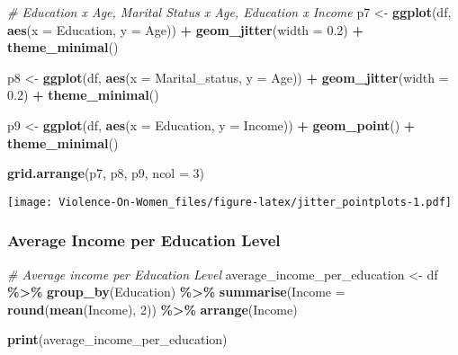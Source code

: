 \documentclass[
]{article}
\newenvironment{Shaded}{\begin{snugshade}}{\end{snugshade}}
\newcommand{\AttributeTok}[1]{\textcolor[rgb]{0.13,0.29,0.53}{#1}}
\newcommand{\CommentTok}[1]{\textcolor[rgb]{0.56,0.35,0.01}{\textit{#1}}}
\newcommand{\DecValTok}[1]{\textcolor[rgb]{0.00,0.00,0.81}{#1}}
\newcommand{\FloatTok}[1]{\textcolor[rgb]{0.00,0.00,0.81}{#1}}
\newcommand{\FunctionTok}[1]{\textcolor[rgb]{0.13,0.29,0.53}{\textbf{#1}}}
\newcommand{\NormalTok}[1]{#1}
\newcommand{\OtherTok}[1]{\textcolor[rgb]{0.56,0.35,0.01}{#1}}
\newcommand{\SpecialCharTok}[1]{\textcolor[rgb]{0.81,0.36,0.00}{\textbf{#1}}}
\begin{document}
\begin{Shaded}
\begin{Highlighting}[]
\CommentTok{\# Education x Age, Marital Status x Age, Education x Income}
\NormalTok{p7 }\OtherTok{\textless{}{-}} \FunctionTok{ggplot}\NormalTok{(df, }\FunctionTok{aes}\NormalTok{(}\AttributeTok{x =}\NormalTok{ Education, }\AttributeTok{y =}\NormalTok{ Age)) }\SpecialCharTok{+}
  \FunctionTok{geom\_jitter}\NormalTok{(}\AttributeTok{width =} \FloatTok{0.2}\NormalTok{) }\SpecialCharTok{+}
  \FunctionTok{theme\_minimal}\NormalTok{()}

\NormalTok{p8 }\OtherTok{\textless{}{-}} \FunctionTok{ggplot}\NormalTok{(df, }\FunctionTok{aes}\NormalTok{(}\AttributeTok{x =}\NormalTok{ Marital\_status, }\AttributeTok{y =}\NormalTok{ Age)) }\SpecialCharTok{+}
  \FunctionTok{geom\_jitter}\NormalTok{(}\AttributeTok{width =} \FloatTok{0.2}\NormalTok{) }\SpecialCharTok{+}
  \FunctionTok{theme\_minimal}\NormalTok{()}

\NormalTok{p9 }\OtherTok{\textless{}{-}} \FunctionTok{ggplot}\NormalTok{(df, }\FunctionTok{aes}\NormalTok{(}\AttributeTok{x =}\NormalTok{ Education, }\AttributeTok{y =}\NormalTok{ Income)) }\SpecialCharTok{+}
  \FunctionTok{geom\_point}\NormalTok{() }\SpecialCharTok{+}
  \FunctionTok{theme\_minimal}\NormalTok{()}

\FunctionTok{grid.arrange}\NormalTok{(p7, p8, p9, }\AttributeTok{ncol =} \DecValTok{3}\NormalTok{)}
\end{Highlighting}
\end{Shaded}

\texttt{[image: Violence-On-Women\_files/figure-latex/jitter\_pointplots-1.pdf]}

\hypertarget{average-income-per-education-level}{%
\subsubsection{Average Income per Education
Level}\label{average-income-per-education-level}}

\begin{Shaded}
\begin{Highlighting}[]
\CommentTok{\# Average income per Education Level}
\NormalTok{average\_income\_per\_education }\OtherTok{\textless{}{-}}\NormalTok{ df }\SpecialCharTok{\%\textgreater{}\%}
  \FunctionTok{group\_by}\NormalTok{(Education) }\SpecialCharTok{\%\textgreater{}\%}
  \FunctionTok{summarise}\NormalTok{(}\AttributeTok{Income =} \FunctionTok{round}\NormalTok{(}\FunctionTok{mean}\NormalTok{(Income), }\DecValTok{2}\NormalTok{)) }\SpecialCharTok{\%\textgreater{}\%}
  \FunctionTok{arrange}\NormalTok{(Income)}

\FunctionTok{print}\NormalTok{(average\_income\_per\_education)}
\end{Highlighting}
\end{Shaded}
\end{document}
